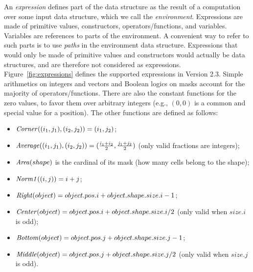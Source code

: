 \documentclass[a4paper]{llncs}
\begin{document}
An {\em expression} defines part of the data structure as the result
of a computation over some input data structure, which we call the
{\em environment}. Expressions are made of primitive values,
constructors, operators/functions, and variables.
Variables are references to parts of the environment. A convenient way
to refer to such parts is to use {\em paths} in the environment data
structure.
%
Expressions that would only be made of primitive values and
constructors would actually be data structures, and are therefore not
considered as expressions.
%
Figure~\ref{fig:expressions} defines the supported expressions in
Version 2.3. Simple arithmetics on integers and vectors and Boolean
logics on masks account for the majority of operators/functions. There
are also the constant functions for the zero values, to favor them
over arbitrary integers (e.g., $(0,0)$ is a common and special value
for a position). The other functions are defined as follows:
\begin{itemize}
\item ${\it Corner}((i_1,j_1), (i_2,j_2)) = (i_1,j_2)$;
\item ${\it Average}((i_1,j_1), (i_2,j_2)) = (\frac{i_1+i_2}{2}, \frac{j_1+j_2}{2})$ (only valid fractions are integers);
\item ${\it Area}(shape)$ is the cardinal of its mask (how many cells belong to the shape);
\item ${\it Norm1}((i,j)) = i+j$;
\item ${\it Right}(object) = object.pos.i + object.shape.size.i - 1$;
\item ${\it Center}(object) = object.pos.i + object.shape.size.i / 2$ (only valid when $size.i$ is odd);
\item ${\it Bottom}(object) = object.pos.j + object.shape.size.j - 1$;
\item ${\it Middle}(object) = object.pos.j + object.shape.size.j / 2$ (only valid when $size.j$ is odd).  
\end{itemize}
\end{document}
